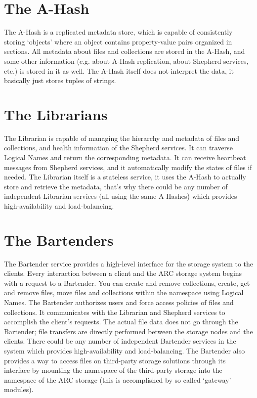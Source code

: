 \documentclass{book}
\begin{document}

\section{The A-Hash} %
\label{sec:the_a_hash}

The A-Hash is a replicated metadata store, which is capable of consistently storing `objects' where an object contains property-value pairs organized in sections. All metadata about files and collections are stored in the A-Hash, and some other information (e.g. about A-Hash replication, about Shepherd services, etc.) is stored in it as well. The A-Hash itself does not interpret the data, it basically just stores tuples of strings.


\section{The Librarians} %
\label{sec:the_librarians}

The Librarian is capable of managing the hierarchy and metadata of files and collections, and health information of the Shepherd services. It can traverse Logical Names and return the corresponding metadata. It can receive heartbeat messages from Shepherd services, and it automatically modify the states of files if needed. The Librarian itself is a stateless service, it uses the A-Hash to actually store and retrieve the metadata, that’s why there could be any number of independent Librarian services (all using the same A-Hashes) which provides high-availability and load-balancing.


\section{The Bartenders} %
\label{sec:the_bartenders}

The Bartender service provides a high-level interface for the storage system to the clients. Every interaction between a client and the ARC storage system begins with a request to a Bartender. You can create and remove collections, create, get and remove files, move files and collections within the namespace using Logical Names. The Bartender authorizes users and force access policies of files and collections. It communicates with the Librarian and Shepherd services to accomplish the client’s requests. The actual file data does not go through the Bartender; file transfers are directly performed between the storage nodes and the clients. There could be any number of independent Bartender services in the system which provides high-availability and load-balancing. The Bartender also provides a way to access files on third-party storage solutions through its interface by mounting the namespace of the third-party storage into the namespace of the ARC storage (this is accomplished by so called `gateway' modules). 
\end{document}
